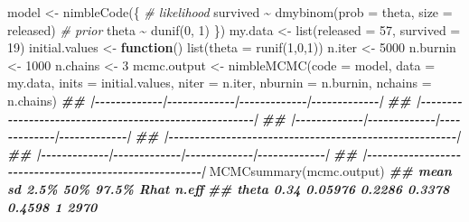 \documentclass[
  12pt,
]{krantz}
\newenvironment{Shaded}{\begin{snugshade}}{\end{snugshade}}
\newcommand{\AttributeTok}[1]{\textcolor[rgb]{0.77,0.63,0.00}{#1}}
\newcommand{\CommentTok}[1]{\textcolor[rgb]{0.56,0.35,0.01}{\textit{#1}}}
\newcommand{\ControlFlowTok}[1]{\textcolor[rgb]{0.13,0.29,0.53}{\textbf{#1}}}
\newcommand{\DecValTok}[1]{\textcolor[rgb]{0.00,0.00,0.81}{#1}}
\newcommand{\DocumentationTok}[1]{\textcolor[rgb]{0.56,0.35,0.01}{\textbf{\textit{#1}}}}
\newcommand{\FunctionTok}[1]{\textcolor[rgb]{0.00,0.00,0.00}{#1}}
\newcommand{\NormalTok}[1]{#1}
\newcommand{\OtherTok}[1]{\textcolor[rgb]{0.56,0.35,0.01}{#1}}
\newcommand{\SpecialCharTok}[1]{\textcolor[rgb]{0.00,0.00,0.00}{#1}}
\begin{document}
\begin{Shaded}
\begin{Highlighting}[]
\NormalTok{model }\OtherTok{\textless{}{-}} \FunctionTok{nimbleCode}\NormalTok{(\{}
 \CommentTok{\# likelihood}
\NormalTok{ survived }\SpecialCharTok{\textasciitilde{}} \FunctionTok{dmybinom}\NormalTok{(}\AttributeTok{prob =}\NormalTok{ theta, }\AttributeTok{size =}\NormalTok{ released)}
 \CommentTok{\# prior}
\NormalTok{ theta }\SpecialCharTok{\textasciitilde{}} \FunctionTok{dunif}\NormalTok{(}\DecValTok{0}\NormalTok{, }\DecValTok{1}\NormalTok{)}
\NormalTok{\})}
\NormalTok{my.data }\OtherTok{\textless{}{-}} \FunctionTok{list}\NormalTok{(}\AttributeTok{released =} \DecValTok{57}\NormalTok{, }\AttributeTok{survived =} \DecValTok{19}\NormalTok{)}
\NormalTok{initial.values }\OtherTok{\textless{}{-}} \ControlFlowTok{function}\NormalTok{() }\FunctionTok{list}\NormalTok{(}\AttributeTok{theta =} \FunctionTok{runif}\NormalTok{(}\DecValTok{1}\NormalTok{,}\DecValTok{0}\NormalTok{,}\DecValTok{1}\NormalTok{))}
\NormalTok{n.iter }\OtherTok{\textless{}{-}} \DecValTok{5000}
\NormalTok{n.burnin }\OtherTok{\textless{}{-}} \DecValTok{1000}
\NormalTok{n.chains }\OtherTok{\textless{}{-}} \DecValTok{3}
\NormalTok{mcmc.output }\OtherTok{\textless{}{-}} \FunctionTok{nimbleMCMC}\NormalTok{(}\AttributeTok{code =}\NormalTok{ model,}
 \AttributeTok{data =}\NormalTok{ my.data,}
 \AttributeTok{inits =}\NormalTok{ initial.values,}
 \AttributeTok{niter =}\NormalTok{ n.iter,}
 \AttributeTok{nburnin =}\NormalTok{ n.burnin,}
 \AttributeTok{nchains =}\NormalTok{ n.chains)}
\DocumentationTok{\#\# |{-}{-}{-}{-}{-}{-}{-}{-}{-}{-}{-}{-}{-}|{-}{-}{-}{-}{-}{-}{-}{-}{-}{-}{-}{-}{-}|{-}{-}{-}{-}{-}{-}{-}{-}{-}{-}{-}{-}{-}|{-}{-}{-}{-}{-}{-}{-}{-}{-}{-}{-}{-}{-}|}
\DocumentationTok{\#\# |{-}{-}{-}{-}{-}{-}{-}{-}{-}{-}{-}{-}{-}{-}{-}{-}{-}{-}{-}{-}{-}{-}{-}{-}{-}{-}{-}{-}{-}{-}{-}{-}{-}{-}{-}{-}{-}{-}{-}{-}{-}{-}{-}{-}{-}{-}{-}{-}{-}{-}{-}{-}{-}{-}{-}|}
\DocumentationTok{\#\# |{-}{-}{-}{-}{-}{-}{-}{-}{-}{-}{-}{-}{-}|{-}{-}{-}{-}{-}{-}{-}{-}{-}{-}{-}{-}{-}|{-}{-}{-}{-}{-}{-}{-}{-}{-}{-}{-}{-}{-}|{-}{-}{-}{-}{-}{-}{-}{-}{-}{-}{-}{-}{-}|}
\DocumentationTok{\#\# |{-}{-}{-}{-}{-}{-}{-}{-}{-}{-}{-}{-}{-}{-}{-}{-}{-}{-}{-}{-}{-}{-}{-}{-}{-}{-}{-}{-}{-}{-}{-}{-}{-}{-}{-}{-}{-}{-}{-}{-}{-}{-}{-}{-}{-}{-}{-}{-}{-}{-}{-}{-}{-}{-}{-}|}
\DocumentationTok{\#\# |{-}{-}{-}{-}{-}{-}{-}{-}{-}{-}{-}{-}{-}|{-}{-}{-}{-}{-}{-}{-}{-}{-}{-}{-}{-}{-}|{-}{-}{-}{-}{-}{-}{-}{-}{-}{-}{-}{-}{-}|{-}{-}{-}{-}{-}{-}{-}{-}{-}{-}{-}{-}{-}|}
\DocumentationTok{\#\# |{-}{-}{-}{-}{-}{-}{-}{-}{-}{-}{-}{-}{-}{-}{-}{-}{-}{-}{-}{-}{-}{-}{-}{-}{-}{-}{-}{-}{-}{-}{-}{-}{-}{-}{-}{-}{-}{-}{-}{-}{-}{-}{-}{-}{-}{-}{-}{-}{-}{-}{-}{-}{-}{-}{-}|}
\FunctionTok{MCMCsummary}\NormalTok{(mcmc.output)}
\DocumentationTok{\#\#       mean      sd   2.5\%    50\%  97.5\% Rhat n.eff}
\DocumentationTok{\#\# theta 0.34 0.05976 0.2286 0.3378 0.4598    1  2970}
\end{Highlighting}
\end{Shaded}
\end{document}
